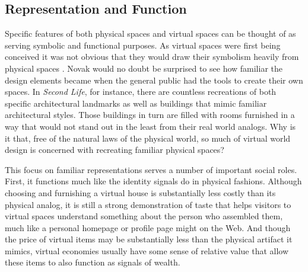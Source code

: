 \subsection{Representation and Function}
Specific features of both physical spaces and virtual spaces can be thought of as serving symbolic and functional purposes. As virtual spaces were first being conceived it was not obvious that they would draw their symbolism heavily from physical spaces \citep{Novak:1991ue}. Novak would no doubt be surprised to see how familiar the design elements became when the general public had the tools to create their own spaces. In \emph{Second Life}, for instance, there are countless recreations of both specific architectural landmarks as well as buildings that mimic familiar architectural styles. Those buildings in turn are filled with rooms furnished in a way that would not stand out in the least from their real world analogs. Why is it that, free of the natural laws of the physical world, so much of virtual world design is concerned with recreating familiar physical spaces? 

This focus on familiar representations serves a number of important social roles. First, it functions much like the identity signals do in physical fashions. Although choosing and furnishing a virtual house is substantially less costly than its physical analog, it is still a strong demonstration of taste that helps visitors to virtual spaces understand something about the person who assembled them, much like a personal homepage or profile page might on the Web. And though the price of virtual items may be substantially less than the physical artifact it mimics, virtual economies usually have some sense of relative value that allow these items to also function as signals of wealth.

